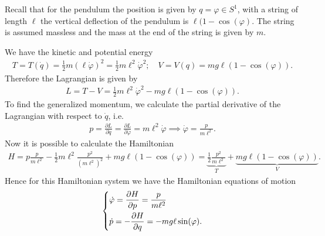 \begin{ex}
	Recall that for the pendulum the position is given by $q=\varphi\in S^{1}$, with a string of length $\ell$ the vertical deflection of the pendulum is $\ell(1- \cos(\varphi)$. The string is assumed massless and the mass at the end of the string is given by $m$. 
	
	We have the kinetic and potential energy 
	\begin{align}
		T = T(\dot{q}) = \frac{1}{2} m (\ell \dot{\varphi})^{2} = \frac{1}{2} m\ell^2 \dot{\varphi}^{2};\quad V = V(q) = mg\ell(1-\cos(\varphi)).
	\end{align}
Therefore the Lagrangian is given by
\begin{align}
	L = T-V = \frac{1}{2}m \ell^2 \dot{\varphi}^{2} - mg\ell(1-\cos(\varphi)).
\end{align}
To find the generalized momentum, we calculate the partial derivative of the Lagrangian with respect to $\dot{q}$, i.e.
\begin{align}
p = \frac{\partial L}{\partial \dot{q}} = \frac{\partial L}{\partial \dot{\varphi}} = m\ell^2 \dot{\varphi}\implies \dot{\varphi} = \frac{p}{m\ell^2}.
\end{align}
Now it is possible to calculate the Hamiltonian
\begin{align}
	H = p \frac{p}{m\ell^2} - \frac{1}{2}m\ell^2 \frac{p^2}{(m\ell^2)^2} + mg\ell(1-\cos(\varphi))
	= \underbrace{\frac{1}{2} \frac{p^2}{m\ell^2}}_{T} + \underbrace{mg\ell(1-\cos(\varphi))}_{V}.
\end{align}
Hence for this Hamiltonian system we have the Hamiltonian equations of motion
\begin{align}
\begin{dcases}
	\dot{\varphi} = \frac{\partial H}{\partial p} = \frac{p}{m\ell^2} \\
	\dot{p} = - \frac{\partial H}{\partial q} = -mg\ell \sin (\varphi).
\end{dcases}
\end{align}
\end{ex}

